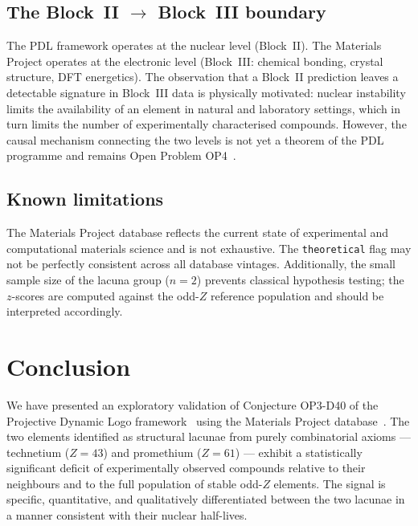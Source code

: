 \documentclass[11pt,a4paper]{article}
\theoremstyle{definition}
\theoremstyle{remark}
\begin{document}
\subsection{The Block~II \texorpdfstring{$\to$}{→} Block~III boundary}

The PDL framework operates at the nuclear level (Block~II). The Materials Project operates at the electronic level (Block~III: chemical bonding, crystal structure, DFT energetics). The observation that a Block~II prediction leaves a detectable signature in Block~III data is physically motivated: nuclear instability limits the availability of an element in natural and laboratory settings, which in turn limits the number of experimentally characterised compounds. However, the causal mechanism connecting the two levels is not yet a theorem of the PDL programme and remains Open Problem OP4~\cite{Laubscher_DM_2025}.

\subsection{Known limitations}

The Materials Project database reflects the current state of experimental and computational materials science and is not exhaustive. The \texttt{theoretical} flag may not be perfectly consistent across all database vintages. Additionally, the small sample size of the lacuna group ($n=2$) prevents classical hypothesis testing; the $z$-scores are computed against the odd-$Z$ reference population and should be interpreted accordingly.

\section{Conclusion}
\label{sec:conclusion}

We have presented an exploratory validation of Conjecture OP3-D40 of the Projective Dynamic Logo framework~\cite{Laubscher_D40_2025} using the Materials Project database~\cite{Jain_2013}. The two elements identified as structural lacunae from purely combinatorial axioms --- technetium ($Z=43$) and promethium ($Z=61$) --- exhibit a statistically significant deficit of experimentally observed compounds relative to their neighbours and to the full population of stable odd-$Z$ elements. The signal is specific, quantitative, and qualitatively differentiated between the two lacunae in a manner consistent with their nuclear half-lives.
\end{document}
